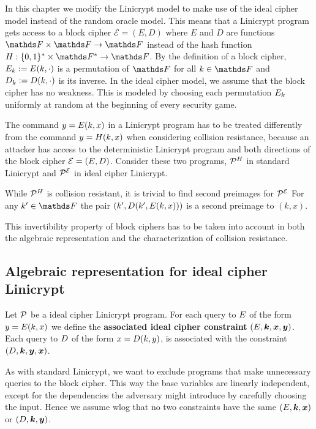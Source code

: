 In this chapter we modify the Linicrypt model to make use of the ideal cipher model instead of the random oracle model.
This means that a Linicrypt program gets access to a block cipher $\mathcal{E} = (E, D)$ where $E$ and $D$ are functions $\F \times \F \to \F$
instead of the hash function $\H : \{0,1\}^* \times \F^* \to \F$.
By the definition of a block cipher,
$\E_k := \E(k, \cdot)$ is a permutation of $\F$ for all $k \in \F$ and
$\D_k := \D(k, \cdot)$ is its inverse.
In the ideal cipher model, we assume that the block cipher has no weakness.
This is modeled by choosing each permutation $\E_k$ uniformly at random at the beginning of every security game.

The command $y = \E(k, x)$ in a Linicrypt program has to be treated differently from the command $y = \H(k, x)$ when considering collision resistance,
because an attacker has access to the deterministic Linicrypt program and both directions of the block cipher $\mathcal{E} = (\E, \D)$.
Consider these two programs, $\PH$ in standard Linicrypt and $\PE$ in ideal cipher Linicrypt.

\begin{pchstack}[center,space=2cm]
\end{pchstack}
While $\PH$ is collision resistant, it is trivial to find second preimages for $\PE$
For any $k' \in \F$ the pair $(k', \D(k', \E(k, x)))$ is a second preimage to $(k,x)$.

This invertibility property of block ciphers has to be taken into account
in both the algebraic representation and the characterization of collision resistance.

\subsection{Algebraic representation for ideal cipher Linicrypt}

Let $\P$ be a ideal cipher Linicrypt program. For each query to $\E$ of the form $y =
\E(k,x)$ we define the \textbf{associated ideal cipher constraint} $(\E, \v k, \v x, \v y)$.
Each query to $\D$ of the form $x = \D(k, y)$, is
associated with the constraint $(\D, \v k, \v y, \v x)$.

As with standard Linicrypt,
we want to exclude programs that make unnecessary queries to the block cipher.
This way the base variables are linearly independent,
except for the dependencies the adversary might introduce by carefully choosing the input.
Hence we assume wlog that no two constraints have the same $(\E, \v k, \v x)$ or $(\D, \v k, \v y)$.

